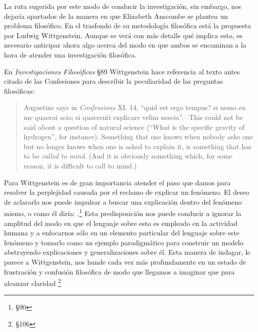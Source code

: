 La ruta sugerida por este modo de conducir la investigación, sin embargo, nos
dejaría apartados de la manera en que Elizabeth Anscombe se plantea un problema
filosófico. En el trasfondo de su metodología filosófica está la propuesta por
Ludwig Wittgenstein. Aunque se verá con más detalle qué implica esto, es
necesario anticipar ahora algo acerca del modo en que ambos se encaminan a la
hora de atender una investigación filosófica.

En \emph{Investigaciones Filosóficas} \S89 Wittgenstein hace referencia al texto
antes citado de las Confesiones para describir la peculiaridad de las preguntas
filosóficas:

\blockquote{Augustine says in \emph{Confessions} XI. 14, ``quid est ergo tempus?
  si nemo ex me quaerat scio; si quaerenti explicare velim nescio''. --This
  could not be said about a question of natural science (``What is the specific
  gravity of hydrogen'', for instance). Something that one knows when nobody
  asks one but no longer knows when one is asked to explain it, is something
  that has to be \emph{called to mind}. (And it is obviously something which,
  for some reason, it is difficult to call to mind.)}

Para Wittgenstein es de gran importancia atender el paso que damos para resolver
la perplejidad causada por el reclamo de explicar un fenómeno. El deseo de
aclararlo nos puede impulsar a buscar una explicación dentro del fenómeno mismo,
o como él diría: .\footnote{\S90} Esta predisposición nos puede conducir a ignorar la
amplitud del modo en que el lenguaje sobre esto es empleado en la actividad
humana y a enfocarnos sólo en un elemento particular del lenguaje sobre este
fenómeno y tomarlo como un ejemplo paradigmático para construir un modelo
abstrayendo explicaciones y generalizaciones sobre él. Esta manera de indagar,
le parece a Wittgenstein, nos hunde cada vez más profundamente en un estado de
frustración y confusión filosófica de modo que llegamos a imaginar que para
alcanzar claridad \footnote{\S106}

